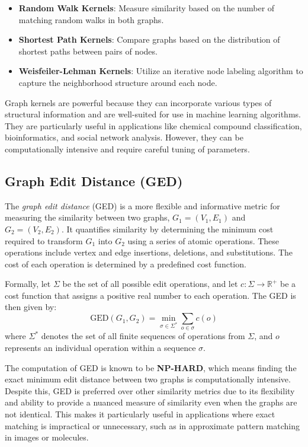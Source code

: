 \documentclass[../Thesis.tex]{subfiles}
\begin{document}
	\begin{itemize}
		\item \textbf{Random Walk Kernels}: Measure similarity based on the number of matching random walks in both graphs.
		\item \textbf{Shortest Path Kernels}: Compare graphs based on the distribution of shortest paths between pairs of nodes.
		\item \textbf{Weisfeiler-Lehman Kernels}: Utilize an iterative node labeling algorithm to capture the neighborhood structure around each node.
	\end{itemize}
	
	Graph kernels are powerful because they can incorporate various types of structural information and are well-suited for use in machine learning algorithms. They are particularly useful in applications like chemical compound classification, bioinformatics, and social network analysis. However, they can be computationally intensive and require careful tuning of parameters.
	
	\subsection{Graph Edit Distance (GED)}
	The \emph{graph edit distance} (GED) is a more flexible and informative metric for measuring the similarity between two graphs, $G_1 = (V_1, E_1)$ and $G_2 = (V_2, E_2)$. It quantifies similarity by determining the minimum cost required to transform $G_1$ into $G_2$ using a series of atomic operations. These operations include vertex and edge insertions, deletions, and substitutions. The cost of each operation is determined by a predefined cost function.
	
	Formally, let $\Sigma$ be the set of all possible edit operations, and let $c: \Sigma \to \mathbb{R}^+$ be a cost function that assigns a positive real number to each operation. The GED is then given by:
	\[
	\text{GED}(G_1, G_2) = \min_{\sigma \in \Sigma^*} \sum_{o \in \sigma} c(o)
	\]
	where $\Sigma^*$ denotes the set of all finite sequences of operations from $\Sigma$, and $o$ represents an individual operation within a sequence $\sigma$.
	
	The computation of GED is known to be \textbf{NP-HARD}, which means finding the exact minimum edit distance between two graphs is computationally intensive. Despite this, GED is preferred over other similarity metrics due to its flexibility and ability to provide a nuanced measure of similarity even when the graphs are not identical. This makes it particularly useful in applications where exact matching is impractical or unnecessary, such as in approximate pattern matching in images or molecules.
	
\end{document}
